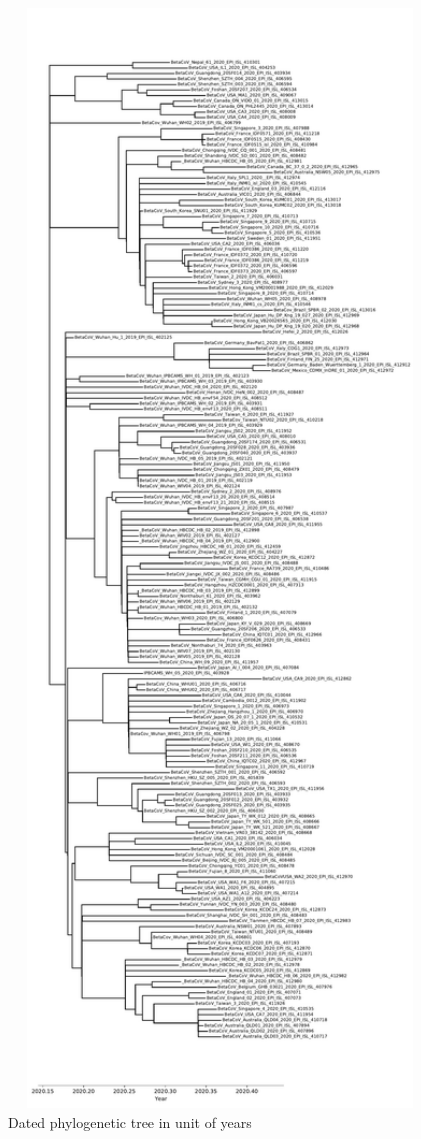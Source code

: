 \documentclass{article}
\begin{document}
\begin{figure}[h]
\centering
\includegraphics[width=1\textwidth]{./figs/tree_time.pdf}
\caption{Dated phylogenetic tree in unit of years}
\end{figure}
\end{document}
